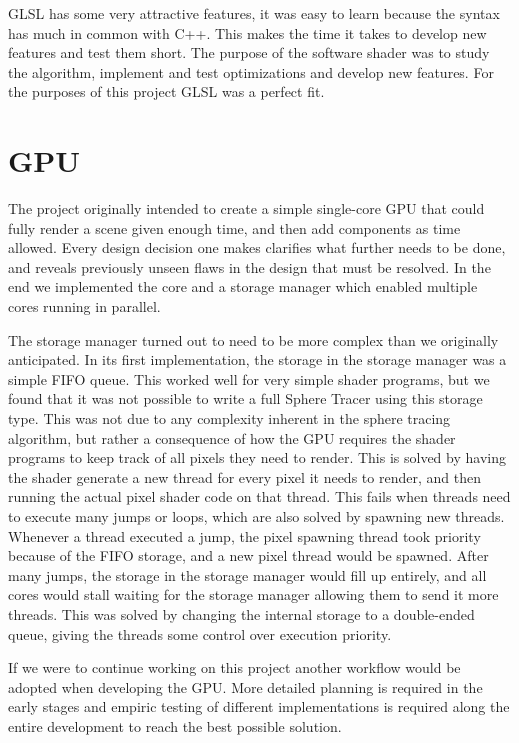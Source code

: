 			GLSL has some very attractive features, it was easy to learn 
			because the syntax has much in common with C++. This makes the time it takes 
			to develop new features and	test them short. The purpose of the 
			software shader was to study the algorithm, implement and test 
			optimizations and develop new features. For the purposes of this 
			project GLSL was a perfect fit.
		
		\section{GPU} 
		
			The project originally intended to create a simple single-core GPU
			that could fully render a scene given enough time, and then add	
			components as time allowed. Every design decision one makes 
			clarifies what further needs to be done, and reveals previously 
			unseen flaws in the design that must
			be resolved. In the end we implemented the core and a storage 
			manager which enabled multiple cores running in parallel.

			The storage manager turned out to need to be more complex than we 
			originally anticipated. In its first implementation, the storage in
			the storage manager was a simple FIFO queue. This worked well for 
			very simple shader programs, but we found that it was not possible
			to write a full Sphere Tracer using this storage type. This was not
			due to any complexity inherent in the sphere tracing algorithm, but
			rather a consequence of how the GPU requires the shader programs to
			keep track of all pixels they need to render. This is solved by 
			having the shader generate a new thread for every pixel it needs to
			render, and then running the actual pixel shader code on that 
			thread. This fails when threads need to execute many jumps or 
			loops, which are also solved by spawning new threads. Whenever a 
			thread executed a jump, the pixel spawning thread took priority 
			because of the FIFO storage, and a new pixel thread would be 
			spawned. After many jumps, the storage in the storage manager would 
			fill up entirely, and all cores would stall waiting for the 
			storage manager allowing them to send it more threads. This was 
			solved by changing the internal storage to a double-ended queue,
			giving the threads some control over execution priority.

			If we were to continue working on this project another workflow
			would be adopted when developing the GPU. More detailed planning is
			required in the early stages and empiric testing of different
			implementations is required along the entire development to reach
			the best possible solution.

